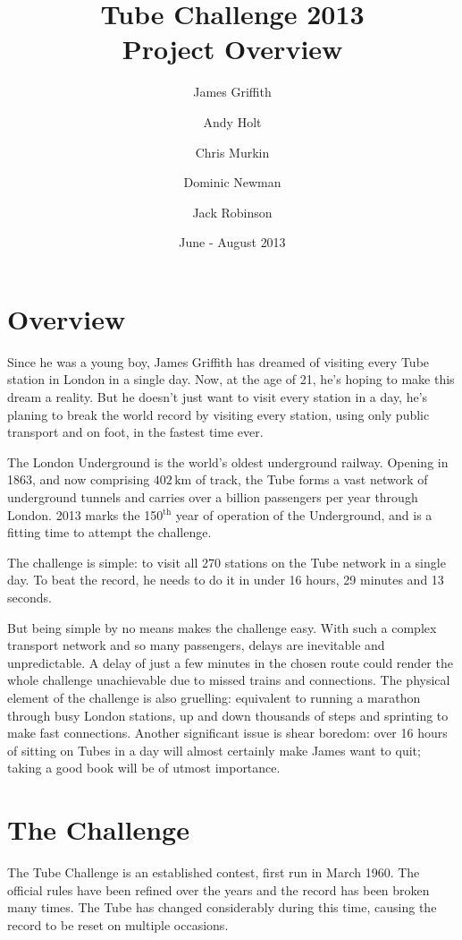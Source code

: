 \documentclass[a4paper,11pt]{article}  %
\title{Tube Challenge 2013\\Project Overview}
\author{James Griffith \and Andy Holt \and Chris Murkin \and Dominic
  Newman \and Jack Robinson}
\date{June - August 2013}
\begin{document}
\listoftodos

\maketitle

\section*{Overview}

Since he was a young boy, James Griffith has dreamed of visiting every
Tube station in London in a single day. Now, at the age of 21, he's
hoping to make this dream a reality. But he doesn't just want to visit
every station in a day, he's planing to break the world record by
visiting every station, using only public transport and on foot, in
the fastest time ever.

The London Underground is the world's oldest underground
railway. Opening in 1863, and now comprising $402\,\mathrm{km}$ of
track, the Tube forms a vast network of underground tunnels and
carries over a billion passengers per year through London. 2013 marks
the 150$^{\mathrm{th}}$ year of operation of the Underground, and is a
fitting time to attempt the challenge.

The challenge is simple: to visit all 270 stations on the Tube network
in a single day. To beat the record, he needs to do it in
under 16 hours, 29 minutes and 13 seconds.

But being simple by no means makes the challenge easy. With such a
complex transport network and so many passengers, delays are
inevitable and unpredictable. A delay of just a few minutes in the
chosen route could render the whole challenge unachievable due to
missed trains and connections. The physical element of the challenge
is also gruelling: equivalent to running a marathon through busy
London stations, up and down thousands of steps and sprinting to make
fast connections. Another significant issue is shear boredom: over 16
hours of sitting on Tubes in a day will almost certainly make James
want to quit; taking a good book will be of utmost importance.

\section*{The Challenge}

The Tube Challenge is an established contest, first run in March
1960. The official rules have been refined over the years and the
record has been broken many times. The Tube has changed considerably
during this time, causing the record to be reset on multiple
occasions.
\end{document}
